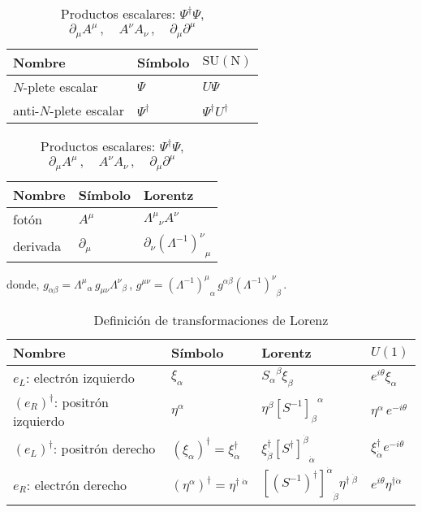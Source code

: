 \begin{frame}

\begin{table}
  \centering
   \begin{tabular}{lll}
    Nombre & Símbolo & $\operatorname{SU(N)}$ \\\hline
    $N$-plete escalar & $\Psi$ & $U \Psi$ \\
    anti-$N$-plete escalar & $\Psi^\dagger $ & $\Psi^\dagger U^\dagger $ \\\hline
    \end{tabular}\hspace{3cm}
   \begin{tabular}{lll}
    Nombre & Símbolo & Lorentz \\\hline
    fotón & $A^\mu$ & ${\Lambda^\mu}_\nu A^\nu$ \\
    derivada & $\partial_\mu$ & $\partial_\nu {\left(\Lambda^{-1}\right)^\nu}_\mu$ \\\hline
  \end{tabular}
  \caption{
       Productos escalares: $\Psi^\dagger \Psi$,  \hspace{4cm}
       $\partial_\mu A^{\mu}\,,\quad A^\nu A_\nu \,,\quad \partial_\mu  \partial^\mu$
}
  \label{tab:fermionlr}
\end{table}
donde,
 $g_{\alpha\beta}={\Lambda^{\mu}}_{\alpha}\,g_{\mu\nu}{\Lambda^{\nu}}_{\beta}\,$,
  $g^{\mu\nu}={\left( \Lambda^{-1} \right)^{\mu}}_{\alpha}\,g^{\alpha\beta} {\left( \Lambda^{-1} \right)^{\nu}}_{\beta}\,$.


\begin{table}
  \centering
  \begin{tabular}{llll}
    Nombre & Símbolo & Lorentz & $U(1)$\\\hline\hline
    $e_L$: electrón izquierdo & $\xi_{\alpha}$ & ${S_{\alpha}}^{\beta}\xi_{\beta}$ & $e^{i\theta}\xi_\alpha$\\
   $\left( e_R \right)^{\dagger}$: positrón izquierdo&$\eta^{\alpha}$& $\eta^\beta{\left[  S^{-1}  \right]_{\beta}}^{\alpha}$ & $\eta^\alpha\, e^{-i\theta}$\\
    \hline    
    $\left( e_L \right)^{\dagger}$: positrón derecho   & $\left( \xi_{\alpha} \right)^{\dagger}=\xi^{\dagger}_{\dot{\alpha}}$ &
     $\xi^{\dagger}_{\dot{\beta}}{\left[{S^{\dagger}}\right]^{\dot{\beta}}}_{\dot{\alpha}}$ & $\xi^\dagger_{\dot{\alpha}} e^{-i\theta}$\\
   $e_R$: electrón derecho   & $\left( \eta^{\alpha} \right)^{\dagger}=\eta^{\dagger\;\dot{\alpha}}$ & ${\left[ \left( S^{-1} \right)^\dagger \right]^{\dot{\alpha}}}_{\dot{\beta}}\eta^{\dagger\;\dot{\beta}}$& $e^{i\theta}\eta^{\dagger\dot{\alpha}}$ \\\hline\hline
  \end{tabular}
  \caption{Definición de transformaciones de Lorenz}
  \label{tab:fermionlr}
\end{table}




\end{frame}
